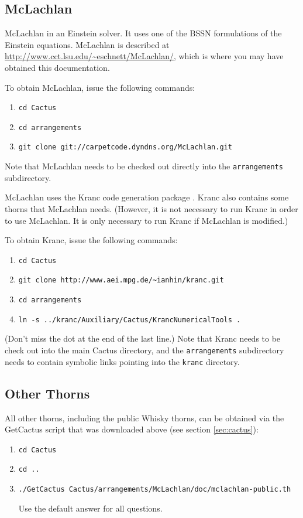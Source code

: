 \documentclass[11pt, tightenlines]{revtex4}
\newcommand{\code}[1]{\texttt{#1}}
\begin{document}
\subsection{McLachlan}

McLachlan \cite{ES-Brown2007b, ES-mclachlanweb} in an Einstein solver.
It uses one of the BSSN formulations of the Einstein equations.
McLachlan is described at
\url{http://www.cct.lsu.edu/~eschnett/McLachlan/}, which is where you
may have obtained this documentation.

To obtain McLachlan, issue the following commands:
\begin{enumerate}
\item\verb+cd Cactus+
\item\verb+cd arrangements+
\item\verb+git clone git://carpetcode.dyndns.org/McLachlan.git+
\end{enumerate}
Note that McLachlan needs to be checked out directly into the
\code{arrangements} subdirectory.

McLachlan uses the Kranc code generation package \cite{kranc04,
  Husa:2004ip, krancweb, ES-krancweb}.  Kranc also contains some
thorns that McLachlan needs.  (However, it is not necessary to run
Kranc in order to use McLachlan.  It is only necessary to run Kranc if
McLachlan is modified.)

To obtain Kranc, issue the following commands:
\begin{enumerate}
\item\verb+cd Cactus+
\item\verb+git clone http://www.aei.mpg.de/~ianhin/kranc.git+
\item\verb+cd arrangements+
\item\verb+ln -s ../kranc/Auxiliary/Cactus/KrancNumericalTools .+
\end{enumerate}
(Don't miss the dot at the end of the last line.)  Note that Kranc
needs to be check out into the main Cactus directory, and the
\code{arrangements} subdirectory needs to contain symbolic links
pointing into the \code{kranc} directory.

\subsection{Other Thorns}

All other thorns, including the public Whisky thorns, can be obtained
via the GetCactus script that was downloaded above (see section
\ref{sec:cactus}):

\begin{enumerate}
\item\verb+cd Cactus+
\item\verb+cd ..+
\item\verb+./GetCactus Cactus/arrangements/McLachlan/doc/mclachlan-public.th+
  
  Use the default answer for all questions.
\end{enumerate}
\end{document}

